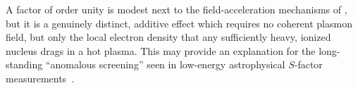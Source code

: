 A factor of order unity is modest next to the field-acceleration mechanisms of , but it is a genuinely distinct, additive effect which requires no coherent plasmon field, but only the local electron density that any sufficiently heavy, ionized nucleus drags in a hot plasma. This may provide an explanation for the long-standing ``anomalous screening'' seen in low-energy astrophysical $S$-factor measurements~\cite{Grayson:2025kva}.
